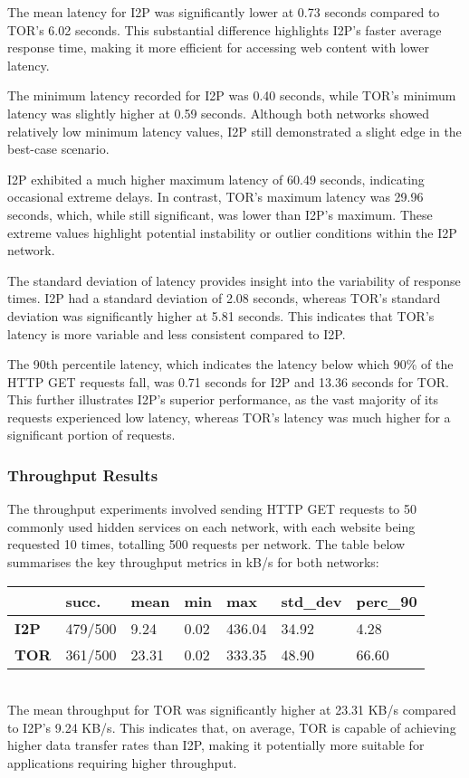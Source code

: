 \documentclass[12pt,conference]{IEEEtran}
\begin{document}
The mean latency for I2P was significantly lower at 0.73 seconds compared to TOR's 6.02 seconds. This substantial difference highlights I2P's faster average response time, making it more efficient for accessing web content with lower latency.

The minimum latency recorded for I2P was 0.40 seconds, while TOR's minimum latency was slightly higher at 0.59 seconds. Although both networks showed relatively low minimum latency values, I2P still demonstrated a slight edge in the best-case scenario.

I2P exhibited a much higher maximum latency of 60.49 seconds, indicating occasional extreme delays. In contrast, TOR's maximum latency was 29.96 seconds, which, while still significant, was lower than I2P's maximum. These extreme values highlight potential instability or outlier conditions within the I2P network.

The standard deviation of latency provides insight into the variability of response times. I2P had a standard deviation of 2.08 seconds, whereas TOR's standard deviation was significantly higher at 5.81 seconds. This indicates that TOR's latency is more variable and less consistent compared to I2P.

The 90th percentile latency, which indicates the latency below which 90\% of the HTTP GET requests fall, was 0.71 seconds for I2P and 13.36 seconds for TOR. This further illustrates I2P's superior performance, as the vast majority of its requests experienced low latency, whereas TOR's latency was much higher for a significant portion of requests.

\subsubsection{Throughput Results} The throughput experiments involved sending HTTP GET requests to 50 commonly used hidden services on each network, with each website being requested 10 times, totalling 500 requests per network. The table below summarises the key throughput metrics in kB/s for both networks:
\begin{table}[h]
\begin{tabular}{lllllll}
\textbf{}    & \textbf{succ.} & \textbf{mean} & \textbf{min} & \textbf{max} & \textbf{std\_dev} & \textbf{perc\_90} \\ \hline
\textbf{I2P} & 479/500        & 9.24          & 0.02         & 436.04        & 34.92              & 4.28              \\
\textbf{TOR} & 361/500        & 23.31          & 0.02         & 333.35        & 48.90              & 66.60            
\end{tabular}
\end{table}
\\
The mean throughput for TOR was significantly higher at 23.31 KB/s compared to I2P's 9.24 KB/s. This indicates that, on average, TOR is capable of achieving higher data transfer rates than I2P, making it potentially more suitable for applications requiring higher throughput.
\end{document}
